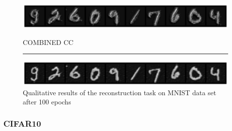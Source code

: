 \begin{figure}[h]
    \centerline{\hspace*{8mm}\includegraphics[width=1.4\textwidth]{figures/reconstruction_MNIST_RP_ReLU_CC_epoch_100.png}}
    \caption*{\normalsize{COMBINED CC}}
    \rule{0.4\textwidth}{.4pt}
    
    \centerline{\hspace*{8mm}\includegraphics[width=1.4\textwidth]{figures/reconstruction_MNIST_COMBINED_CC_epoch_100.png}}
    
    \caption{Qualitative results of the reconstruction task on MNIST data set after 100 epochs}
    \label{fig:MNIST_Images}
\end{figure}



\subsubsection{CIFAR10}

